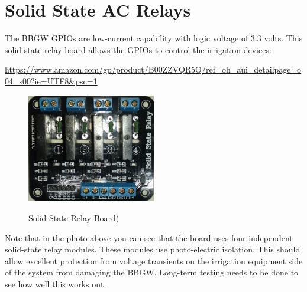 %
%
%

\chapter{Solid State AC Relays}

The BBGW GPIOs are low-current capability with logic voltage of 3.3 volts.  
This solid-state relay board allows the GPIOs to control the irrigation devices:

\url{https://www.amazon.com/gp/product/B00ZZVQR5Q/ref=oh_aui_detailpage_o04_s00?ie=UTF8&psc=1}

\begin{figure}[h]
	\centering
    \includegraphics[width=0.5\textwidth]{photos/sainsmart_4relay_board.jpg}
	\centering\bfseries
	\caption{Solid-State Relay Board)}
\end{figure}

Note that in the photo above you can see that the board uses four independent 
solid-state relay modules.  These modules use photo-electric isolation.  This 
should allow excellent protection from voltage transients on the irrigation 
equipment side of the system from damaging the BBGW.  Long-term testing needs 
to be done to see how well this works out.

